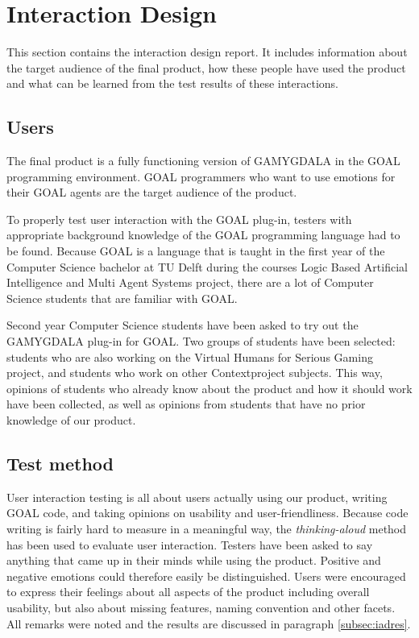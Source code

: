 \section{Interaction Design}
This section contains the interaction design report. It includes information about the target audience of the final product, how these people have used the product and what can be learned from the test results of these interactions.

\subsection{Users}
The final product is a fully functioning version of GAMYGDALA in the GOAL programming environment. GOAL programmers who want to use emotions for their GOAL agents are the target audience of the product.

To properly test user interaction with the GOAL plug-in, testers with appropriate background knowledge of the GOAL programming language had to be found. Because GOAL is a language that is taught in the first year of the Computer Science bachelor at TU Delft during the courses Logic Based Artificial Intelligence and Multi Agent Systems project, there are a lot of Computer Science students that are familiar with GOAL.

Second year Computer Science students have been asked to try out the GAMYGDALA plug-in for GOAL. Two groups of students have been selected: students who are also working on the Virtual Humans for Serious Gaming project, and students who work on other Contextproject subjects. This way, opinions of students who already know about the product and how it should work have been collected, as well as opinions from students that have no prior knowledge of our product.

\subsection{Test method}
User interaction testing is all about users actually using our product, writing GOAL code, and taking opinions on usability and user-friendliness. Because code writing is fairly hard to measure in a meaningful way, the \textit{thinking-aloud} method \citep{thinking-aloud} has been used to evaluate user interaction. Testers have been asked to say anything that came up in their minds while using the product. Positive and negative emotions could therefore easily be distinguished. Users were encouraged to express their feelings about all aspects of the product including overall usability, but also about missing features, naming convention and other facets. All remarks were noted and the results are discussed in paragraph \ref{subsec:iadres}.

